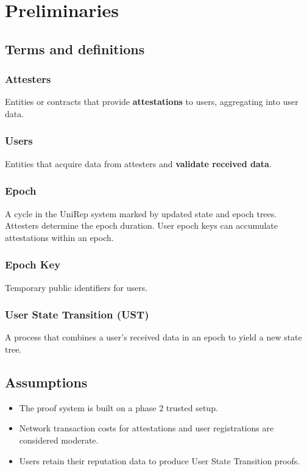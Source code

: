 \documentclass[11pt]{article}
\begin{document}
\section{Preliminaries}
\label{sec:orgf209d8a}

\subsection{Terms and definitions}
\label{sec:org70280b3}

\subsubsection{Attesters}
\label{sec:org498d8a3}
Entities or contracts that provide \textbf{\textbf{attestations}} to users, aggregating into user data.
\subsubsection{Users}
\label{sec:org431e77b}
Entities that acquire data from attesters and \textbf{\textbf{validate received data}}.
\subsubsection{Epoch}
\label{sec:org35c3cac}
A cycle in the UniRep system marked by updated state and epoch trees. Attesters determine the epoch duration. User epoch keys can accumulate attestations within an epoch.
\subsubsection{Epoch Key}
\label{sec:org92d1b0d}
Temporary public identifiers for users.
\subsubsection{User State Transition (UST)}
\label{sec:org56044e0}
A process that combines a user's received data in an epoch to yield a new state tree.
\subsection{Assumptions}
\label{sec:org86b2fac}
\begin{itemize}
\item The proof system is built on a phase 2 trusted setup.
\item Network transaction costs for attestations and user registrations are considered moderate.
\item Users retain their reputation data to produce User State Transition proofs.
\end{itemize}
\end{document}
